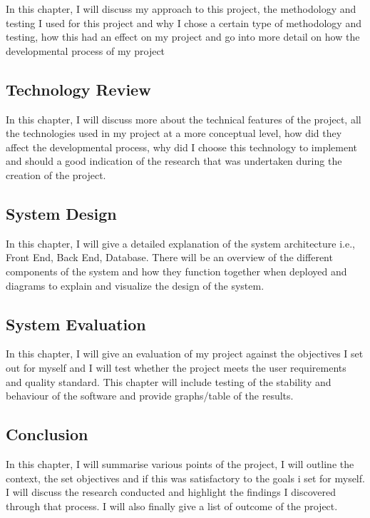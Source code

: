 In this chapter, I will discuss my approach to this project, the methodology and testing I used for this project and why I chose a certain type of methodology and testing, how this had an effect on my project and go into more detail on how the developmental process of my project

\subsection{Technology Review}

In this chapter, I will discuss more about the technical features of the project, all the technologies used in my project at a more conceptual level, how did they affect the developmental process, why did I choose this technology to implement and should a good indication of the research that was undertaken during the creation of the project.

\subsection{System Design}

In this chapter, I will give a detailed explanation of the system architecture i.e., Front End, Back End, Database. There will be an overview of the different components of the system and how they function together when deployed and diagrams to explain and visualize the design of the system.

\subsection{System Evaluation}

In this chapter, I will give an evaluation of my project against the objectives I set out for myself and I will test whether the project meets the user requirements and quality standard. This chapter will include testing of the stability and behaviour of the software and provide graphs/table of the results.

\subsection{Conclusion}

In this chapter, I will summarise various points of the project, I will outline the context, the set objectives and if this was satisfactory to the goals i set for myself. I will discuss the research conducted and highlight the findings I discovered through that process. I will also finally give a list of outcome of the project.

